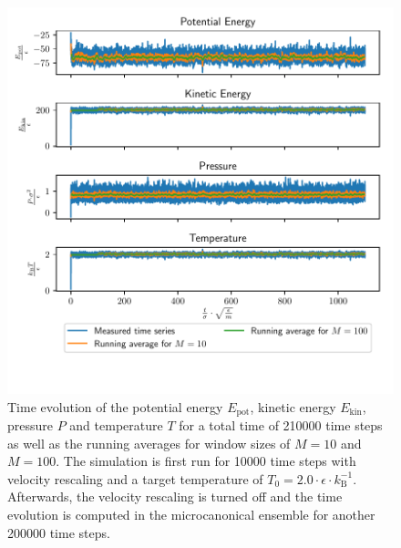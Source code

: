 \documentclass[a4paper,10pt,bibtotoc]{scrartcl}
\begin{document}
\begin{figure}
        \centering
        \includegraphics[width=\linewidth]{Figure_6.pdf}
    \caption{Time evolution of the potential energy $E_\mathrm{pot}$, kinetic energy $E_\mathrm{kin}$, pressure $P$ and temperature $T$ for a total time of 210000 time steps as well as the running averages for window sizes of $M=10$ and $M=100$. The simulation is first run for 10000 time steps with velocity rescaling and a target temperature of $T_0 = 2.0\cdot \epsilon\cdot k_\mathrm{B}^{-1}$. Afterwards, the velocity rescaling is turned off and the time evolution is computed in the microcanonical ensemble for another 200000 time steps.}
    \label{fig:fig6}
\end{figure}

\newpage
\end{document}
